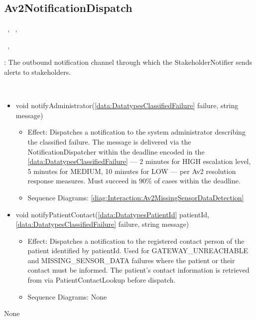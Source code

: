   \subsection{Av2NotificationDispatch}\label{int:InterfacesAv2NotificationDispatch}
    \begin{description}
      \item[Provided by:] \iconcomponent{}~, \iconcomponent{}~, \iconcomponent{}~
      \item[Required by:] \iconcomponent{}~, \iconcomponent{}~ 
           \item[Description]: The outbound notification channel through which the StakeholderNotifier sends alerts to stakeholders.
      \item[Operations:] ~
    \begin{itemize}[noitemsep,nolistsep,leftmargin=-.25cm]
      \item \textsf{void notifyAdministrator(\ref{data:DatatypesClassifiedFailure} failure, string message)}
        \begin{itemize}[noitemsep,nolistsep]
           \item Effect: Dispatches a notification to the system administrator describing the classified failure. The message is delivered via the NotificationDispatcher within the deadline encoded in the \ref{data:DatatypesClassifiedFailure} — 2 minutes for HIGH escalation level, 5 minutes for MEDIUM, 10 minutes for LOW — per Av2 resolution response measures. Must succeed in 90\% of cases within the deadline. 
           \item Sequence Diagrams: \cref{diag:Interaction:Av2MissingSensorDataDetection}
        \end{itemize}
      \item \textsf{void notifyPatientContact(\ref{data:DatatypesPatientId} patientId, \ref{data:DatatypesClassifiedFailure} failure, string message)}
        \begin{itemize}[noitemsep,nolistsep]
           \item Effect: Dispatches a notification to the registered contact person of the patient identified by patientId. Used for GATEWAY\_UNREACHABLE and MISSING\_SENSOR\_DATA failures where the patient or their contact must be informed. The patient's contact information is retrieved from  via PatientContactLookup before dispatch. 
           \item Sequence Diagrams: None
        \end{itemize}
    \end{itemize}
      \item[Diagrams:] None
    \end{description}

